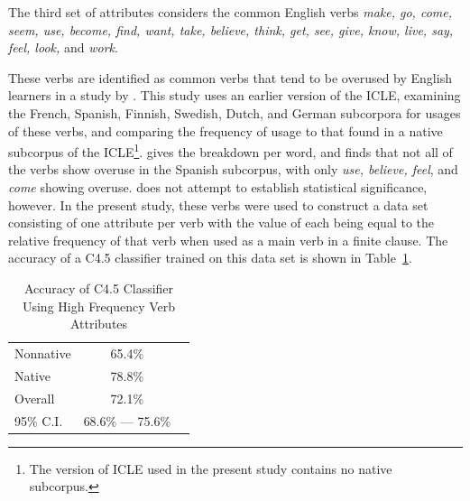 \documentclass[main.tex]{subfiles}
\begin{document}
The third set of attributes considers the common English verbs \textit{make, go, come, seem, use, become, find, want, take, believe, think, get, see, give, know, live, say, feel, look,} and \textit{work}.

These verbs are identified as common verbs that tend to be overused by English learners in a study by \citet{ringbom:1998}. This study uses an earlier version of the ICLE, examining the French, Spanish, Finnish, Swedish, Dutch, and German subcorpora for usages of these verbs, and comparing the frequency of usage to that found in a native subcorpus of the ICLE\footnote{The version of ICLE used in the present study contains no native subcorpus.}. \citeauthor{ringbom:1998} gives the breakdown per word, and finds that not all of the verbs show overuse in the Spanish subcorpus, with only \textit{use, believe, feel}, and \textit{come} showing overuse. \citeauthor{ringbom:1998} does not attempt to establish statistical significance, however. In the present study, these verbs were used to construct a data set consisting of one attribute per verb with the value of each being equal to the relative frequency of that verb when used as a main verb in a finite clause. The accuracy of a C4.5 classifier trained on this data set is shown in Table~\ref{table:high-freq-results}.
\begin{table}[htbp]
\centering
\caption{Accuracy of C4.5 Classifier Using High Frequency Verb Attributes}
\begin{tabular}{l c c}
\toprule
Nonnative & 65.4\% \\
Native & 78.8\% \\
Overall & 72.1\% \\
95\% C.I. & 68.6\% --- 75.6\%\\
\bottomrule
\end{tabular}
\label{table:high-freq-results}
\end{table}
\end{document}
